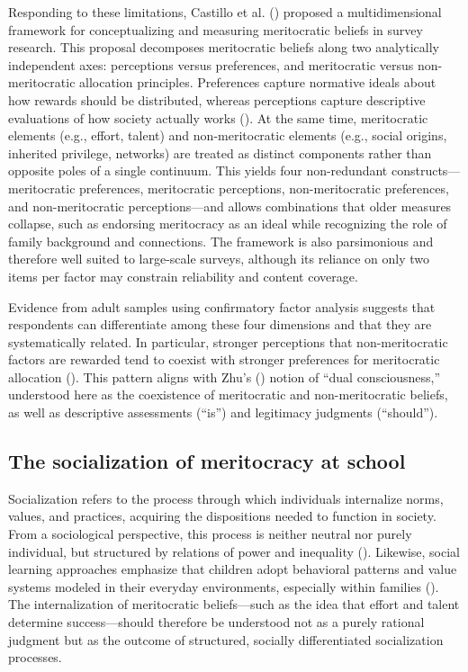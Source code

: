 \documentclass[
  13pt,
]{article}
\begin{document}
Responding to these limitations, Castillo et al.
() proposed a
multidimensional framework for conceptualizing and measuring
meritocratic beliefs in survey research. This proposal decomposes
meritocratic beliefs along two analytically independent axes:
perceptions versus preferences, and meritocratic versus non-meritocratic
allocation principles. Preferences capture normative ideals about how
rewards should be distributed, whereas perceptions capture descriptive
evaluations of how society actually works
(). At the same
time, meritocratic elements (e.g., effort, talent) and non-meritocratic
elements (e.g., social origins, inherited privilege, networks) are
treated as distinct components rather than opposite poles of a single
continuum. This yields four non-redundant constructs---meritocratic
preferences, meritocratic perceptions, non-meritocratic preferences, and
non-meritocratic perceptions---and allows combinations that older
measures collapse, such as endorsing meritocracy as an ideal while
recognizing the role of family background and connections. The framework
is also parsimonious and therefore well suited to large-scale surveys,
although its reliance on only two items per factor may constrain
reliability and content coverage.

Evidence from adult samples using confirmatory factor analysis suggests
that respondents can differentiate among these four dimensions and that
they are systematically related. In particular, stronger perceptions
that non-meritocratic factors are rewarded tend to coexist with stronger
preferences for meritocratic allocation
().
This pattern aligns with Zhu's
() notion of ``dual
consciousness,'' understood here as the coexistence of meritocratic and
non-meritocratic beliefs, as well as descriptive assessments (``is'')
and legitimacy judgments (``should'').

\subsection{The socialization of meritocracy at
school}\label{the-socialization-of-meritocracy-at-school}

Socialization refers to the process through which individuals
internalize norms, values, and practices, acquiring the dispositions
needed to function in society. From a sociological perspective, this
process is neither neutral nor purely individual, but structured by
relations of power and inequality
(). Likewise, social
learning approaches emphasize that children adopt behavioral patterns
and value systems modeled in their everyday environments, especially
within families (). The internalization of meritocratic beliefs---such as the idea
that effort and talent determine success---should therefore be
understood not as a purely rational judgment but as the outcome of
structured, socially differentiated socialization processes.
\end{document}
